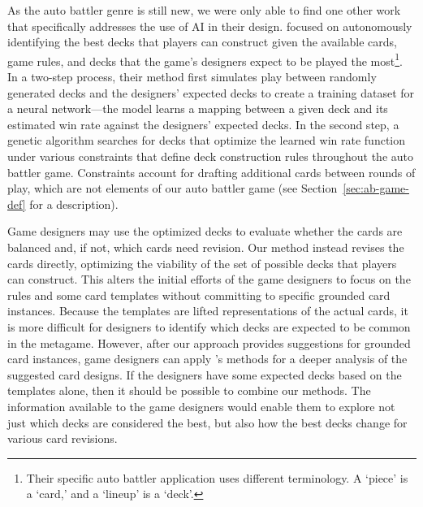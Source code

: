 As the auto battler genre is still new, we were only able to find one other work
that specifically addresses the use of AI in their design.  \citeauthor{tencent_autobattle_lineup}
 focused on autonomously identifying the
best decks that players can construct given the available cards, game rules, and
decks that the game's designers expect to be played the most\footnote{Their specific auto battler application uses different terminology. A `piece' is a `card,' and a `lineup' is a `deck'.}.  In a two-step process,
their method first simulates play between randomly generated decks and the designers'
expected decks to create a training dataset for a neural network---the model
learns a mapping between a given deck and its estimated win rate against the
designers' expected decks.  In the second step, a genetic algorithm searches for
decks that optimize the learned win rate function under various constraints that
define deck construction rules throughout the auto battler game.  Constraints
account for drafting additional cards between rounds of play,
which are not elements of
our auto battler game (see Section~\ref{sec:ab-game-def} for a description).

Game designers may use the optimized decks %
to evaluate whether the cards are balanced and, if not, which
cards need revision.  Our method instead revises the cards directly, optimizing
the viability of the set of possible decks that players can construct.  This alters
the initial efforts of the game designers to focus on the rules and some card templates
without committing to specific grounded card instances.  Because the templates are
lifted representations of the actual %
cards, it is more difficult for designers
to identify which decks are expected to be common in the metagame.  However, after
our approach provides suggestions for grounded card instances, game designers
can apply \citeauthor{tencent_autobattle_lineup}'s methods for a deeper analysis
of the suggested card designs.  If the designers have some expected decks based
on the templates alone, then it should be possible to combine our methods. %
The information available to the game
designers would enable them to explore not just which decks are considered the
best, %
but also how the best decks change for various card
revisions.

